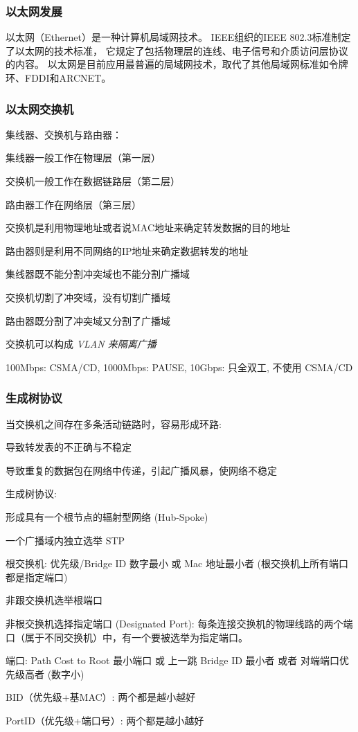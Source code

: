 \documentclass[UTF8,cs4size]{ctexart}
\begin{document}
\subsubsection{以太网发展}
以太网（Ethernet）是一种计算机局域网技术。
IEEE组织的IEEE 802.3标准制定了以太网的技术标准，
它规定了包括物理层的连线、电子信号和介质访问层协议的内容。
以太网是目前应用最普遍的局域网技术，取代了其他局域网标准如令牌环、FDDI和ARCNET。
\subsubsection{以太网交换机}
集线器、交换机与路由器：
\begin{compactitem}
  \item 集线器一般工作在物理层（第一层）
  \item 交换机一般工作在数据链路层（第二层）
  \item 路由器工作在网络层（第三层）
  \item 交换机是利用物理地址或者说MAC地址来确定转发数据的目的地址
  \item 路由器则是利用不同网络的IP地址来确定数据转发的地址
  \item 集线器既不能分割冲突域也不能分割广播域
  \item 交换机切割了冲突域，没有切割广播域
  \item 路由器既分割了冲突域又分割了广播域
  \item 交换机可以构成 \textit{VLAN 来隔离广播}
  \item 100Mbps: CSMA/CD, 1000Mbps: PAUSE, 10Gbps: 只全双工, 不使用 CSMA/CD
\end{compactitem}
\subsubsection{生成树协议}
当交换机之间存在多条活动链路时，容易形成环路:
\begin{compactitem}
  \item 导致转发表的不正确与不稳定
  \item 导致重复的数据包在网络中传递，引起广播风暴，使网络不稳定
\end{compactitem}

生成树协议:
\begin{compactitem}
  \item 形成具有一个根节点的辐射型网络 (Hub-Spoke)
  \item 一个广播域内独立选举 STP
  \item 根交换机: 优先级/Bridge ID 数字最小 或 Mac 地址最小者 (根交换机上所有端口都是指定端口)
  \item 非跟交换机选举根端口
  \item 非根交换机选择指定端口 (Designated Port): 每条连接交换机的物理线路的两个端口（属于不同交换机）中，有一个要被选举为指定端口。
  \item 端口: Path Cost to Root 最小端口 或 上一跳 Bridge ID 最小者 或者 对端端口优先级高者 (数字小)
  \item BID（优先级+基MAC）: 两个都是越小越好
  \item PortID（优先级+端口号）: 两个都是越小越好
\end{compactitem}
\end{document}
